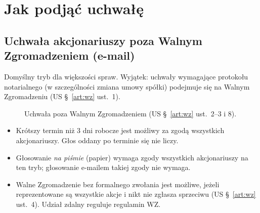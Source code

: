 \documentclass[11pt,a4paper]{report}
\begin{document}
\section{Jak podjąć uchwałę}

\subsection*{Uchwała akcjonariuszy poza Walnym Zgromadzeniem (e-mail)}

Domyślny tryb dla większości spraw. Wyjątek: uchwały wymagające protokołu notarialnego (w szczególności zmiana umowy spółki) podejmuje się na Walnym Zgromadzeniu (US §~\ref{art:wz} ust.~1).

\begin{figure}[H]
\centering
{}
\caption{Uchwała poza Walnym Zgromadzeniem (US §~\ref{art:wz} ust.~2--3 i 8).}
\end{figure}

\begin{itemize}
  \item Krótszy termin niż 3 dni robocze jest możliwy za zgodą wszystkich akcjonariuszy. Głos oddany po terminie się nie liczy.
  \item Głosowanie \emph{na piśmie} (papier) wymaga zgody wszystkich akcjonariuszy na ten tryb; głosowanie e-mailem takiej zgody nie wymaga.
  \item Walne Zgromadzenie bez formalnego zwołania jest możliwe, jeżeli reprezentowane są wszystkie akcje i nikt nie zgłasza sprzeciwu (US §~\ref{art:wz} ust.~4). Udział zdalny reguluje regulamin WZ.
\end{itemize}
\end{document}
